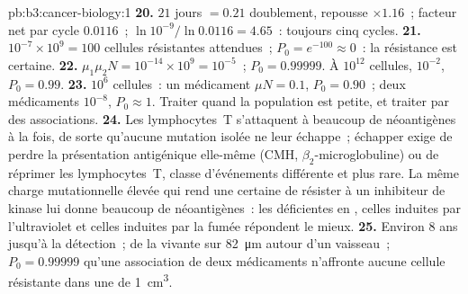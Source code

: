 \begin{solution}{pb:b3:cancer-biology:1}
\textbf{20.} $21$ jours $= 0.21$ doublement, repousse $\times 1.16$~;
facteur net par cycle $0.0116$~; $\ln 10^{-9}/\ln 0.0116 = 4.65$~:
toujours cinq cycles.
\textbf{21.} $10^{-7}\times 10^{9} = 100$ cellules résistantes
attendues~; $P_{0} = e^{-100} \approx 0$~: la résistance est certaine.
\textbf{22.} $\mu_{1}\mu_{2}N = 10^{-14}\times 10^{9} = 10^{-5}$~;
$P_{0} = 0.99999$. À $10^{12}$ cellules, $10^{-2}$, $P_{0} = 0.99$.
\textbf{23.} $10^{6}$ cellules~: un médicament $\mu N = 0.1$,
$P_{0} = 0.90$~; deux médicaments $10^{-8}$, $P_{0} \approx 1$. Traiter
quand la population est petite, et traiter par des associations.
\textbf{24.} Les lymphocytes~T s'attaquent à beaucoup de néoantigènes à
la fois, de sorte qu'aucune mutation isolée ne leur échappe~; échapper
exige de perdre la présentation antigénique elle-même (CMH,
$\beta_{2}$-microglobuline) ou de réprimer les lymphocytes~T, classe
d'événements différente et plus rare. La même charge mutationnelle
élevée qui rend une  certaine de résister à un inhibiteur de
kinase lui donne beaucoup de néoantigènes~: les  déficientes en
, celles induites par l'ultraviolet et
celles induites par la fumée répondent le mieux.
\textbf{25.} Environ $8$ ans jusqu'à la détection~; de la  vivante
sur \qty{82}{\micro m} autour d'un vaisseau~; $P_{0} = 0.99999$ qu'une
association de deux médicaments n'affronte aucune cellule résistante
dans une  de \qty{1}{cm^3}.
\end{solution}
